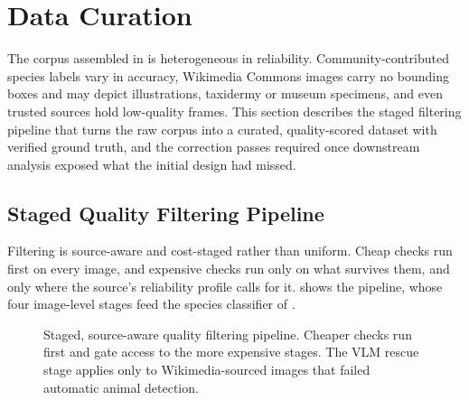 \section{Data Curation}\label{sec:data_quality_and_curation}

The corpus assembled in  is heterogeneous in reliability. Community-contributed species labels vary in accuracy, Wikimedia Commons images carry no bounding boxes and may depict illustrations, taxidermy or museum specimens, and even trusted sources hold low-quality frames. This section describes the staged filtering pipeline that turns the raw corpus into a curated, quality-scored dataset with verified ground truth, and the correction passes required once downstream analysis exposed what the initial design had missed.

\subsection{Staged Quality Filtering Pipeline}\label{sec:staged_filtering_pipeline}

Filtering is source-aware and cost-staged rather than uniform. Cheap checks run first on every image, and expensive checks run only on what survives them, and only where the source's reliability profile calls for it.  shows the pipeline, whose four image-level stages feed the species classifier of .

\begin{figure}[htbp]
\centering
{}
\caption[Staged, source-aware quality filtering pipeline]{Staged, source-aware quality filtering pipeline. Cheaper checks run first and gate access to the more expensive stages. The VLM rescue stage applies only to Wikimedia-sourced images that failed automatic animal detection.}
\label{fig:quality-pipeline}
\end{figure}

